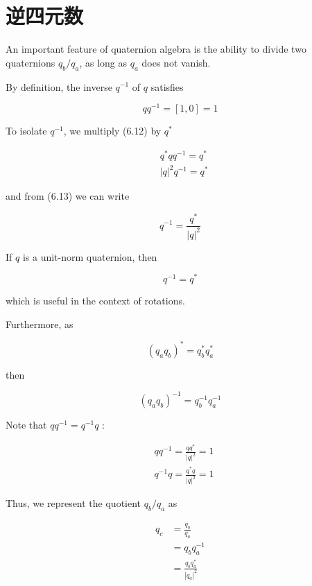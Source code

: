     \section{逆四元数}
    An important feature of quaternion algebra is the ability to divide two quaternions $q_{b} / q_{a}$, as long as $q_{a}$ does not vanish.

    By definition, the inverse $q^{-1}$ of $q$ satisfies

    $$
        q q^{-1}=[1,0]=1
    $$

    To isolate $q^{-1}$, we multiply (6.12) by $q^{*}$

    $$
        \begin{aligned}
             & q^{*} q q^{-1}=q^{*} \\
             & |q|^{2} q^{-1}=q^{*}
        \end{aligned}
    $$

    and from (6.13) we can write

    $$
        q^{-1}=\frac{q^{*}}{|q|^{2}}
    $$

    If $q$ is a unit-norm quaternion, then

    $$
        q^{-1}=q^{*}
    $$

    which is useful in the context of rotations.

    Furthermore, as

    $$
        \left(q_{a} q_{b}\right)^{*}=q_{b}^{*} q_{a}^{*}
    $$

    then

    $$
        \left(q_{a} q_{b}\right)^{-1}=q_{b}^{-1} q_{a}^{-1}
    $$

    Note that $q q^{-1}=q^{-1} q$ :

    $$
        \begin{aligned}
             & q q^{-1}=\frac{q q^{*}}{|q|^{2}}=1 \\
             & q^{-1} q=\frac{q^{*} q}{|q|^{2}}=1
        \end{aligned}
    $$

    Thus, we represent the quotient $q_{b} / q_{a}$ as

    $$
        \begin{aligned}
            q_{c} & =\frac{q_{b}}{q_{a}}                            \\
                  & =q_{b} q_{a}^{-1}                               \\
                  & =\frac{q_{b} q_{a}^{*}}{\left|q_{a}\right|^{2}}
        \end{aligned}
    $$


